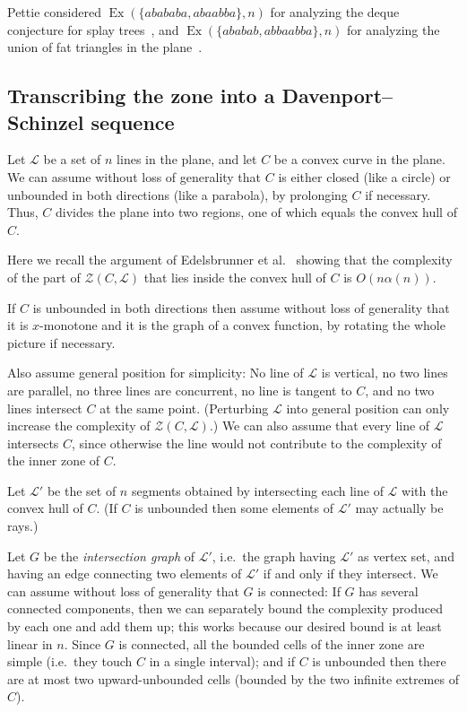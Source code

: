 \documentclass[11pt]{article}
\DeclareMathOperator{\Ex}{Ex}
\theoremstyle{definition}
\theoremstyle{remark}
\begin{document}
Pettie considered $\Ex(\{abababa, abaabba\}, n)$ for analyzing the deque conjecture for splay trees~\cite{pettie_splay}, and $\Ex(\{ababab, abbaabba\}, n)$ for analyzing the union of fat triangles in the plane~\cite{pettie_forbid}.

\subsection{Transcribing the zone into a Davenport--Schinzel sequence}\label{subsec_Lprime}

Let $\mathcal L$ be a set of $n$ lines in the plane, and let $C$ be a convex curve in the plane. We can assume without loss of generality that $C$ is either closed (like a circle) or unbounded in both directions (like a parabola), by prolonging $C$ if necessary. Thus, $C$ divides the plane into two regions, one of which equals the convex hull of $C$.

Here we recall the argument of Edelsbrunner et al.~\cite{EGPPSS} showing that the complexity of the part of $\mathcal Z(C, \mathcal L)$ that lies inside the convex hull of $C$ is $O(n \alpha(n))$.

If $C$ is unbounded in both directions then assume without loss of generality that it is $x$-monotone and it is the graph of a convex function, by rotating the whole picture if necessary.

Also assume general position for simplicity: No line of $\mathcal L$ is vertical, no two lines are parallel, no three lines are concurrent, no line is tangent to $C$, and no two lines intersect $C$ at the same point. (Perturbing $\mathcal L$ into general position can only increase the complexity of $\mathcal Z(C, \mathcal L)$.) We can also assume that every line of $\mathcal L$ intersects $C$, since otherwise the line would not contribute to the complexity of the inner zone of $C$.

Let $\mathcal L'$ be the set of $n$ segments obtained by intersecting each line of $\mathcal L$ with the convex hull of $C$. (If $C$ is unbounded then some elements of $\mathcal L'$ may actually be rays.)

Let $G$ be the \emph{intersection graph} of $\mathcal L'$, i.e.~the graph having $\mathcal L'$ as vertex set, and having an edge connecting two elements of $\mathcal L'$ if and only if they intersect. We can assume without loss of generality that $G$ is connected: If $G$ has several connected components, then we can separately bound the complexity produced by each one and add them up; this works because our desired bound is at least linear in $n$. Since $G$ is connected, all the bounded cells of the inner zone are simple (i.e.~they touch $C$ in a single interval); and if $C$ is unbounded then there are at most two upward-unbounded cells (bounded by the two infinite extremes of $C$).
\end{document}
